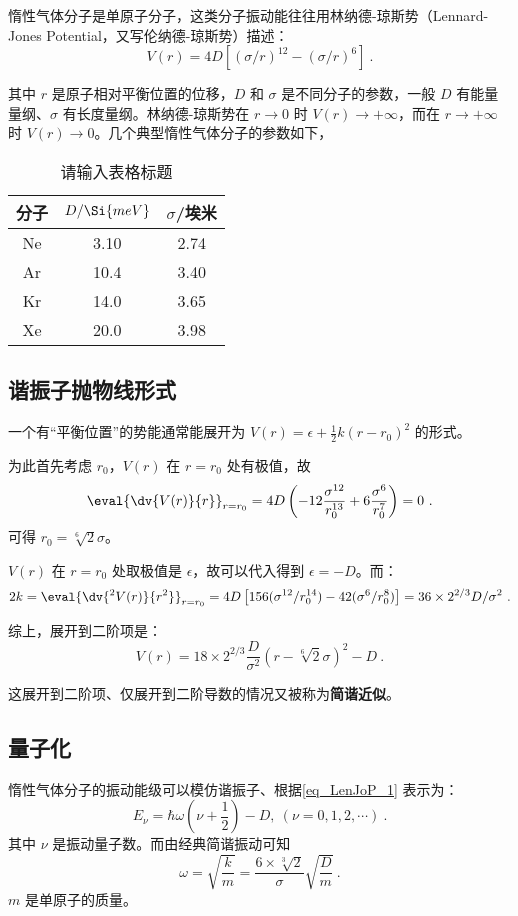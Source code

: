 
惰性气体分子是单原子分子，这类分子振动能往往用林纳德-琼斯势（Lennard-Jones Potential，又写伦纳德-琼斯势）描述：
\begin{equation}
V(r) = 4 D\left[(\sigma / r)^{12} - (\sigma/r)^6\right] ~.
\end{equation}

其中 $r$ 是原子相对平衡位置的位移，$D$ 和 $\sigma$ 是不同分子的参数，一般 $D$ 有能量量纲、$\sigma$ 有长度量纲。林纳德-琼斯势在 $r \rightarrow 0$ 时 $V(r) \rightarrow +\infty$，而在 $r \rightarrow +\infty$ 时 $V(r) \rightarrow 0$。几个典型惰性气体分子的参数如下，
\begin{table}[ht]
\centering
\caption{请输入表格标题}\label{tab_LenJoP1}
\begin{tabular}{|c|c|c|}
\hline
分子 & $D/\Si{meV}$ & $\sigma$/埃米 \\
\hline
Ne & 3.10 & 2.74 \\
\hline
Ar & 10.4 & 3.40 \\
\hline
Kr & 14.0 & 3.65 \\
\hline
Xe & 20.0 & 3.98 \\
\hline
\end{tabular}
\end{table}


\subsection{谐振子抛物线形式}
一个有“平衡位置”的势能通常能展开为 $V(r) = \epsilon + \frac{1}2 k (r-r_0)^2$ 的形式。

为此首先考虑 $r_0$，$V(r)$ 在 $r=r_0$ 处有极值，故
$$\eval{\dv{V(r)}{r}} _{r=r_0} = 4D\left(-12 \frac{\sigma^{12}}{r_0 ^{13}} + 6 \frac{\sigma^6}{r_0^7}\right) = 0~.$$
可得 $r_0 = \sqrt[6]{2} \sigma$。

$V(r)$ 在 $r=r_0$ 处取极值是 $\epsilon$，故可以代入得到 $\epsilon = -D$。而：
$$2 k = \eval{\dv{^2 V(r)}{r^2}}_{r=r_0} = 4 D \left[156 (\sigma^{12} / r_0^{14}) - 42 (\sigma^{6}/r_0^{8})\right] = 36 \times 2^{2/3} D/\sigma^2 ~.$$

综上，展开到二阶项是：
\begin{equation}\label{eq_LenJoP_1}
V(r) = 18 \times 2^{2/3} \frac{D}{\sigma^2} (r - \sqrt[6]{2} \sigma)^2 - D ~.
\end{equation}

这展开到二阶项、仅展开到二阶导数的情况又被称为\textbf{简谐近似}。
\subsection{量子化}
惰性气体分子的振动能级可以模仿谐振子、根据\autoref{eq_LenJoP_1} 表示为：
\begin{equation}
E_\nu = \hbar \omega \left(\nu + \frac12\right) - D,  \ (\nu = 0, 1, 2, \cdots) ~.
\end{equation}
其中 $\nu$ 是振动量子数。而由经典简谐振动可知
\begin{equation}
\omega = \sqrt{\frac km} = \frac{6 \times \sqrt[3]{2}}{\sigma}\sqrt{\frac Dm} ~.
\end{equation} 
$m$ 是单原子的质量。